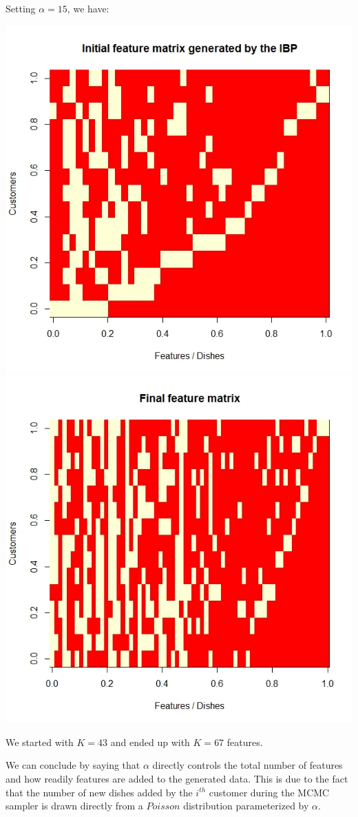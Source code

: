 \documentclass[]{article}
\begin{document}
	Setting $\alpha=15$, we have:
	\begin{center}
		\includegraphics[width=.4\textwidth]{task7/output_initial_alpha15_sigma05_N15.jpeg}
		\includegraphics[width=.4\textwidth]{task7/output_final_alpha15_sigma05_N15.jpeg}
	\end{center}
	We started with $K=43$ and ended up with $K=67$ features.
	
	We can conclude by saying that  $\alpha$ directly controls the total number of features and how readily features are added to the generated data. This is due to the fact that the number of new dishes added by the $i^{th}$ customer during the MCMC sampler is drawn directly from a $Poisson$ distribution parameterized by $\alpha$.
	
\end{document}
